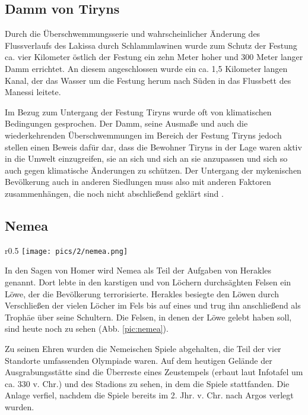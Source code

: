 \documentclass[preprint]{geomorphica} %
\begin{document}
\subsection{Damm von Tiryns}

Durch die Überschwemmungsserie und wahrscheinlicher Änderung des Flussverlaufs des Lakissa durch Schlammlawinen wurde zum Schutz der Festung ca. vier Kilometer östlich der Festung ein zehn Meter hoher und 300 Meter langer Damm errichtet. An diesem angeschlossen wurde ein ca. 1,5 Kilometer langen Kanal, der das Wasser um die Festung herum nach Süden in das Flussbett des Manessi leitete.

Im Bezug zum Untergang der Festung Tiryns wurde oft von klimatischen Bedingungen gesprochen. Der Damm, seine Ausmaße und auch die wiederkehrenden Überschwemmungen im Bereich der Festung Tiryns jedoch stellen einen Beweis dafür dar, dass die Bewohner Tiryns in der Lage waren aktiv in die Umwelt einzugreifen, sie an sich und sich an sie anzupassen und sich so auch gegen klimatische Änderungen zu schützen. Der Untergang der mykenischen Bevölkerung auch in anderen Siedlungen muss also mit anderen Faktoren zusammenhängen, die noch nicht abschließend geklärt sind \cite{unkelHydraHermesHerkules2020}.

\subsection{Nemea}

\begin{wrapfigure}{r}{0.5\textwidth}
    \centering
    \texttt{[image: pics/2/nemea.png]}
    \caption{Kalkfelsen mit vielen Höhleneingängen bei Nemea, der Sage nach hauste hier der Löwe von Nemea.}
    \label{pic:nemea}
\end{wrapfigure}

In den Sagen von Homer wird Nemea als Teil der Aufgaben von Herakles genannt. Dort lebte in den karstigen und von Löchern durchsäghten Felsen ein Löwe, der die Bevölkerung terrorisierte. Herakles besiegte den Löwen durch Verschließen der vielen Löcher im Fels bis auf eines und trug ihn anschließend als Trophäe über seine Schultern. Die Felsen, in denen der Löwe gelebt haben soll, sind heute noch zu sehen (Abb. \ref{pic:nemea}).

Zu seinen Ehren wurden die Nemeischen Spiele abgehalten, die Teil der vier Standorte umfassenden Olympiade waren. Auf dem heutigen Gelände der Ausgrabungsstätte sind die Überreste eines Zeustempels (erbaut laut Infotafel um ca. 330 v. Chr.) und des Stadions zu sehen, in dem die Spiele stattfanden. Die Anlage verfiel, nachdem die Spiele bereits im 2. Jhr. v. Chr. nach Argos verlegt wurden.
\end{document}
